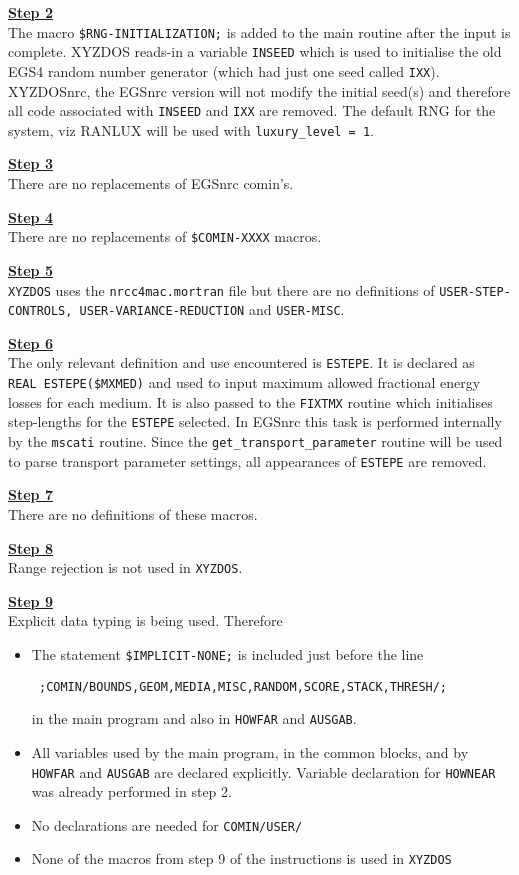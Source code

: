 \noindent
\underline{\bf Step 2} \hfill \\
The macro {\tt \$RNG-INITIALIZATION;} is added to the 
main routine after the input is complete. 
XYZDOS reads-in a variable 
{\tt INSEED} which is used to initialise the old 
EGS4 random number generator (which had just 
one seed called {\tt IXX}). XYZDOSnrc, the EGSnrc version will not
modify the initial seed(s) and therefore all 
code associated with {\tt INSEED} and {\tt IXX} are removed. The default
RNG for the system, viz RANLUX will be used with {\tt luxury\_level = 1}.


\noindent
\underline{\bf Step 3} \hfill \\
There are no replacements of EGSnrc comin's.

\noindent
\underline{\bf Step 4} \hfill \\
There are no replacements of {\tt \$COMIN-XXXX} macros.

\noindent
\underline{\bf Step 5} \hfill \\
{\tt XYZDOS} uses the {\tt nrcc4mac.mortran} file but there are 
no definitions of {\tt USER-STEP-CONTROLS, USER-VARIANCE-REDUCTION} and 
{\tt USER-MISC}.

\noindent
\underline{\bf Step 6} \hfill \\
The only relevant definition and use encountered is {\tt ESTEPE}. 
It is declared as\\
{\tt REAL ESTEPE(\$MXMED)} and used to input 
maximum allowed fractional energy losses for each medium. 
It is also passed to the {\tt FIXTMX} routine which initialises 
step-lengths for the {\tt ESTEPE} selected. In EGSnrc this task 
is performed internally by the {\tt mscati} routine. 
Since the {\tt get\_transport\_parameter} routine will be used
to parse transport parameter settings, all 
appearances of {\tt ESTEPE} are removed. 


\noindent
\underline{\bf Step 7} \hfill \\
There are no definitions of these macros.

\noindent
\underline{\bf Step 8} \hfill \\
Range rejection is not used in {\tt XYZDOS}.

\noindent
\underline{\bf Step 9} \hfill \\
Explicit data typing is being used. Therefore
\begin{itemize}
\item
The statement {\tt \$IMPLICIT-NONE;} is included just before the line 
\begin{flushleft}{\tt 
;COMIN/BOUNDS,GEOM,MEDIA,MISC,RANDOM,SCORE,STACK,THRESH/; }
\end{flushleft}
in the main program and also in {\tt HOWFAR} and {\tt AUSGAB}. 
\item
All variables used by the main program, in 
the common blocks, and by 
{\tt HOWFAR} and {\tt AUSGAB} are declared explicitly. Variable declaration for 
{\tt HOWNEAR} was already performed in step 2.
\item
No declarations are needed for {\tt COMIN/USER/}
\item
None of the macros from step 9 of the instructions is used in 
{\tt XYZDOS}
\end{itemize}

